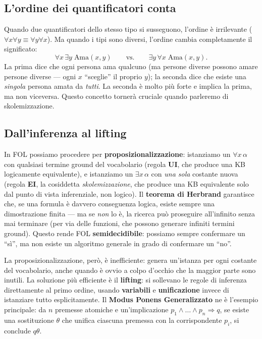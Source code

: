 \documentclass[11pt,a4paper]{article}
\begin{document}
\subsection{L'ordine dei quantificatori conta}

Quando due quantificatori dello stesso tipo si susseguono, l'ordine è irrilevante ($\forall x \forall y \equiv \forall y \forall x$). Ma quando i tipi sono diversi, l'ordine cambia completamente il significato:
\[
\forall x\, \exists y\; \text{Ama}(x,y) \qquad \text{vs.} \qquad \exists y\, \forall x\; \text{Ama}(x,y).
\]
La prima dice che ogni persona ama qualcuno (ma persone diverse possono amare persone diverse --- ogni $x$ ``sceglie'' il proprio $y$); la seconda dice che esiste una \emph{singola} persona amata da \emph{tutti}. La seconda è molto più forte e implica la prima, ma non viceversa. Questo concetto tornerà cruciale quando parleremo di skolemizzazione.

\subsection{Dall'inferenza al lifting}

In FOL possiamo procedere per \textbf{proposizionalizzazione}: istanziamo un $\forall x\,\alpha$ con qualsiasi termine ground del vocabolario (regola \textbf{UI}, che produce una KB logicamente equivalente), e istanziamo un $\exists x\,\alpha$ con \emph{una sola} costante nuova (regola \textbf{EI}, la cosiddetta \emph{skolemizzazione}, che produce una KB equivalente solo dal punto di vista inferenziale, non logico). Il \textbf{teorema di Herbrand} garantisce che, se una formula è davvero conseguenza logica, esiste sempre una dimostrazione finita --- ma se \emph{non} lo è, la ricerca può proseguire all'infinito senza mai terminare (per via delle funzioni, che possono generare infiniti termini ground). Questo rende FOL \textbf{semidecidibile}: possiamo sempre confermare un ``sì'', ma non esiste un algoritmo generale in grado di confermare un ``no''.

La proposizionalizzazione, però, è inefficiente: genera un'istanza per ogni costante del vocabolario, anche quando è ovvio a colpo d'occhio che la maggior parte sono inutili. La soluzione più efficiente è il \textbf{lifting}: si sollevano le regole di inferenza direttamente al primo ordine, usando \textbf{variabili} e \textbf{unificazione} invece di istanziare tutto esplicitamente. Il \textbf{Modus Ponens Generalizzato} ne è l'esempio principale: da $n$ premesse atomiche e un'implicazione $p_1 \wedge \dots \wedge p_n \Rightarrow q$, se esiste una sostituzione $\theta$ che unifica ciascuna premessa con la corrispondente $p_i$, si conclude $q\theta$.
\end{document}
